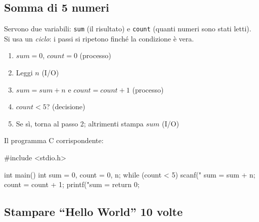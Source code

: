 \documentclass[11pt,a4paper]{article}
\begin{document}
\subsection{Somma di 5 numeri}

Servono due variabili: \texttt{sum} (il risultato) e \texttt{count} (quanti
numeri sono stati letti). Si usa un \emph{ciclo}: i passi si ripetono finché la
condizione è vera.

\begin{enumerate}
    \item $sum = 0$, $count = 0$ (processo)
    \item Leggi $n$ (I/O)
    \item $sum = sum + n$ e $count = count + 1$ (processo)
    \item $count < 5$? (decisione)
    \item Se sì, torna al passo 2; altrimenti stampa $sum$ (I/O)
\end{enumerate}

\begin{center}
\end{center}

Il programma C corrispondente:
\begin{codice}
#include <stdio.h>

int main() {
    int sum = 0, count = 0, n;
    while (count < 5) {
        scanf("%
        sum = sum + n;
        count = count + 1;
    }
    printf("sum = %
    return 0;
}
\end{codice}

\subsection{Stampare ``Hello World'' 10 volte}
\end{document}

